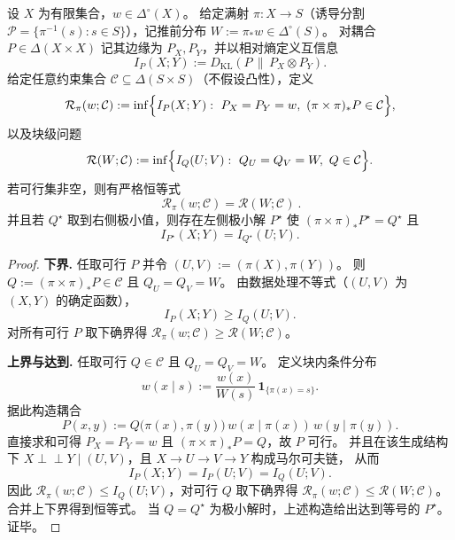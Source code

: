\begin{theorem}[块约束下互信息极小化的降维恒等]\label{thm:conclusion-block-constraint-information-collapse}
设 \(X\) 为有限集合，\(w\in\Delta^\circ(X)\)。
给定满射 \(\pi:X\to S\)（诱导分割 \(\mathcal P=\{\pi^{-1}(s):s\in S\}\)），记推前分布 \(W:=\pi_*w\in\Delta^\circ(S)\)。
对耦合 \(P\in\Delta(X\times X)\) 记其边缘为 \(P_X,P_Y\)，并以相对熵定义互信息
\[
I_P(X;Y):=D_{\mathrm{KL}}\!\left(P\,\middle\|\,P_X\otimes P_Y\right).
\]
给定任意约束集合 \(\mathcal C\subseteq\Delta(S\times S)\)（不假设凸性），定义
\[
\mathcal R_\pi(w;\mathcal C)
:=\inf\Bigl\{ I_P(X;Y):\ P_X=P_Y=w,\ (\pi\times\pi)_*P\in\mathcal C\Bigr\},
\]
以及块级问题
\[
\mathcal R(W;\mathcal C)
:=\inf\Bigl\{ I_Q(U;V):\ Q_U=Q_V=W,\ Q\in\mathcal C\Bigr\}.
\]
若可行集非空，则有严格恒等式
\[
\boxed{\ \mathcal R_\pi(w;\mathcal C)=\mathcal R(W;\mathcal C)\ }.
\]
并且若 \(Q^\star\) 取到右侧极小值，则存在左侧极小解 \(P^\star\) 使 \((\pi\times\pi)_*P^\star=Q^\star\) 且
\[
I_{P^\star}(X;Y)=I_{Q^\star}(U;V).
\]
\end{theorem}
\begin{proof}
\textbf{下界.}
任取可行 \(P\) 并令 \((U,V):=(\pi(X),\pi(Y))\)。
则 \(Q:=(\pi\times\pi)_*P\in\mathcal C\) 且 \(Q_U=Q_V=W\)。
由数据处理不等式（\((U,V)\) 为 \((X,Y)\) 的确定函数），
\[
I_P(X;Y)\ge I_Q(U;V).
\]
对所有可行 \(P\) 取下确界得 \(\mathcal R_\pi(w;\mathcal C)\ge \mathcal R(W;\mathcal C)\)。
\par
\textbf{上界与达到.}
任取可行 \(Q\in\mathcal C\) 且 \(Q_U=Q_V=W\)。
定义块内条件分布
\[
w(x\mid s):=\frac{w(x)}{W(s)}\,\mathbf 1_{\{\pi(x)=s\}}.
\]
据此构造耦合
\[
P(x,y):=Q\!\bigl(\pi(x),\pi(y)\bigr)\,w(x\mid \pi(x))\,w(y\mid \pi(y)).
\]
直接求和可得 \(P_X=P_Y=w\) 且 \((\pi\times\pi)_*P=Q\)，故 \(P\) 可行。
并且在该生成结构下 \(X\!\perp\!\!\!\perp Y\mid(U,V)\)，且 \(X\to U\to V\to Y\) 构成马尔可夫链，
从而
\[
I_P(X;Y)=I_P(U;V)=I_Q(U;V).
\]
因此 \(\mathcal R_\pi(w;\mathcal C)\le I_Q(U;V)\)，对可行 \(Q\) 取下确界得 \(\mathcal R_\pi(w;\mathcal C)\le \mathcal R(W;\mathcal C)\)。
合并上下界得到恒等式。
当 \(Q=Q^\star\) 为极小解时，上述构造给出达到等号的 \(P^\star\)。证毕。
\end{proof}

